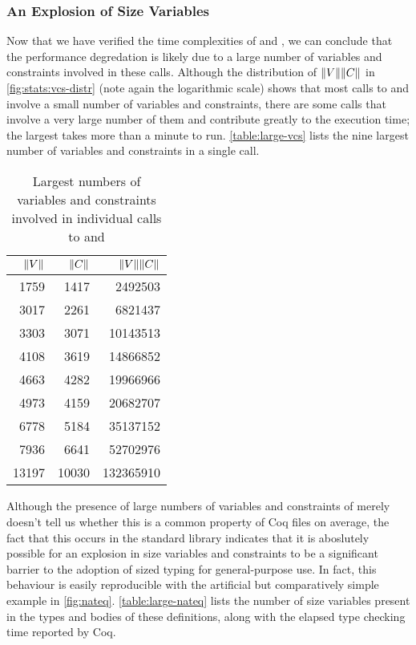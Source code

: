 \subsubsection{An Explosion of Size Variables}

Now that we have verified the time complexities of \solve and \RecCheck,
we can conclude that the performance degredation is likely due to a large number of variables and constraints involved in these calls.
Although the distribution of $\lVert V\rVert\lVert C\rVert$ in \autoref{fig:stats:vcs-distr} (note again the logarithmic scale) shows that most calls to \solve and \RecCheck involve a small number of variables and constraints,
there are some calls that involve a very large number of them and contribute greatly to the execution time;
the largest takes more than a minute to run.
\autoref{table:large-vcs} lists the nine largest number of variables and constraints in a single call.

\begin{table}
\centering
\begin{tabular}{|r | r | r |}
\hline
\textbf{$\lVert V\rVert$} & \textbf{$\lVert C\rVert$} & \textbf{$\lVert V\rVert\lVert C\rVert$} \\
\hline
 1759 &  1417 &   2492503 \\
 3017 &  2261 &   6821437 \\
 3303 &  3071 &  10143513 \\
 4108 &  3619 &  14866852 \\
 4663 &  4282 &  19966966 \\
 4973 &  4159 &  20682707 \\
 6778 &  5184 &  35137152 \\
 7936 &  6641 &  52702976 \\
13197 & 10030 & 132365910 \\
\hline
\end{tabular}
\caption{Largest numbers of variables and constraints involved in individual calls to \solve and \RecCheck}
\label{table:large-vcs}
\end{table}

Although the presence of large numbers of variables and constraints of merely \fieldtheorysized doesn't tell us whether this is a common property of Coq files on average,
the fact that this occurs in the standard library indicates that it is aboslutely possible for an explosion in size variables and constraints to be a significant barrier to the adoption of sized typing for general-purpose use.
In fact, this behaviour is easily reproducible with the artificial but comparatively simple example in \autoref{fig:nateq}.
\autoref{table:large-nateq} lists the number of size variables present in the types and bodies of these definitions,
along with the elapsed type checking time reported by Coq.

